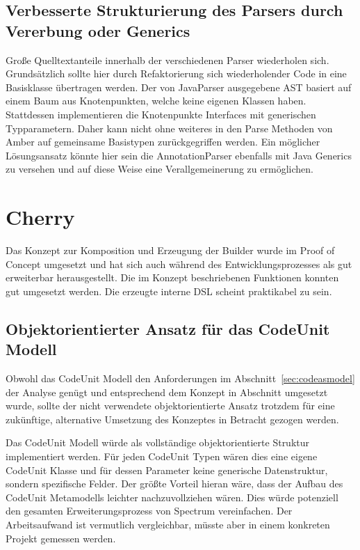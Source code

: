 \documentclass[12pt,oneside,a4paper,parskip]{scrbook}
\begin{document}
\subsection{Verbesserte Strukturierung des Parsers durch Vererbung oder Generics}

Große Quelltextanteile innerhalb der verschiedenen Parser wiederholen sich. Grundsätzlich sollte hier durch Refaktorierung sich wiederholender Code in eine Basisklasse übertragen werden. Der von JavaParser ausgegebene AST basiert auf einem Baum aus Knotenpunkten, welche keine eigenen Klassen haben. Stattdessen implementieren die Knotenpunkte Interfaces mit generischen Typparametern. Daher kann nicht ohne weiteres in den Parse Methoden von Amber auf gemeinsame Basistypen zurückgegriffen werden. Ein möglicher Lösungsansatz könnte hier sein die AnnotationParser ebenfalls mit Java Generics zu versehen und auf diese Weise eine Verallgemeinerung zu ermöglichen.

\section{Cherry}

Das Konzept zur Komposition und Erzeugung der Builder wurde im Proof of Concept umgesetzt und hat sich auch während des Entwicklungsprozesses als gut erweiterbar herausgestellt. Die im Konzept beschriebenen Funktionen konnten gut umgesetzt werden. Die erzeugte interne DSL scheint praktikabel zu sein. 

\subsection{Objektorientierter Ansatz für das CodeUnit Modell}

Obwohl das CodeUnit Modell den Anforderungen im Abschnitt~\ref{sec:codeasmodel} der Analyse genügt und entsprechend dem Konzept in Abschnitt umgesetzt wurde, sollte der nicht verwendete objektorientierte Ansatz trotzdem für eine zukünftige, alternative Umsetzung des Konzeptes in Betracht gezogen werden.

Das CodeUnit Modell würde als vollständige objektorientierte Struktur implementiert werden. Für jeden CodeUnit Typen wären dies eine eigene CodeUnit Klasse und für dessen Parameter keine generische Datenstruktur, sondern spezifische Felder. Der größte Vorteil hieran wäre, dass der Aufbau des CodeUnit Metamodells leichter nachzuvollziehen wären. Dies würde potenziell den gesamten Erweiterungsprozess von Spectrum vereinfachen. Der Arbeitsaufwand ist vermutlich vergleichbar, müsste aber in einem konkreten Projekt gemessen werden.
\end{document}

